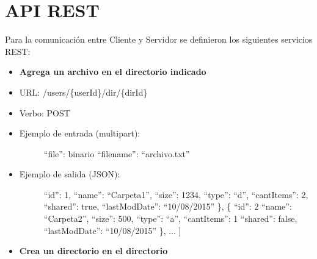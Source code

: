 \documentclass[letterpaper,10pt,english]{sphinxmanual}
\begin{document}
\section{API REST}
\label{uDriveDoc:api-rest}
Para la comunicación entre Cliente y Servidor se definieron los siguientes servicios REST:
\begin{itemize}
\item {} 
\textbf{Agrega un archivo en el directorio indicado}

\end{itemize}
\begin{itemize}
\item {} 
URL: /users/\{userId\}/dir/\{dirId\}

\item {} 
Verbo: POST

\item {} \begin{description}
\item[{Ejemplo de entrada (multipart):}] \leavevmode
``file'': binario
``filename'': ``archivo.txt''

\end{description}

\item {} \begin{description}
\item[{Ejemplo de salida (JSON):}] \leavevmode
``id'': 1,
``name'': ``Carpeta1'',
``size'': 1234,
``type'': ``d'',
``cantItems'': 2,
``shared'': true,
``lastModDate'': ``10/08/2015''
\},
\{
``id'': 2
``name'': ``Carpeta2'',
``size'': 500,
``type'': ``a'',
``cantItems'': 1
``shared'': false,
``lastModDate'': ``10/08/2015''
\},
...
{]}

\end{description}

\end{itemize}
\begin{itemize}
\item {} 
\textbf{Crea un directorio en el directorio}

\end{itemize}
\end{document}
